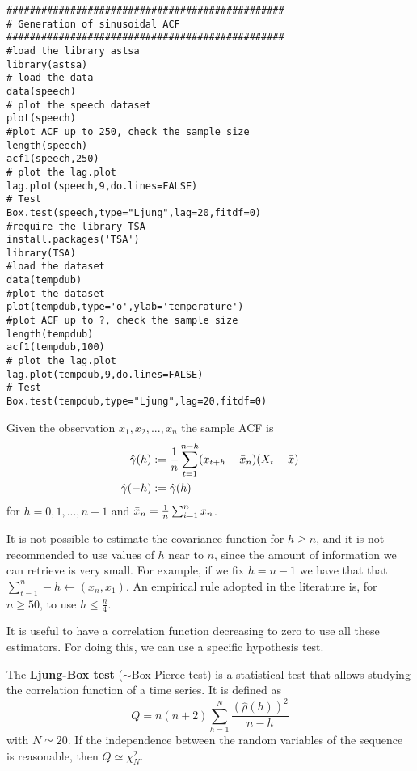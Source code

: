\begin{example}
    \begin{verbatim}
################################################
# Generation of sinusoidal ACF
################################################
#load the library astsa
library(astsa)
# load the data
data(speech)
# plot the speech dataset
plot(speech)
#plot ACF up to 250, check the sample size
length(speech)
acf1(speech,250)
# plot the lag.plot
lag.plot(speech,9,do.lines=FALSE)
# Test
Box.test(speech,type="Ljung",lag=20,fitdf=0)
#require the library TSA
install.packages('TSA')
library(TSA)
#load the dataset
data(tempdub)
#plot the dataset
plot(tempdub,type='o',ylab='temperature')
#plot ACF up to ?, check the sample size
length(tempdub)
acf1(tempdub,100)
# plot the lag.plot
lag.plot(tempdub,9,do.lines=FALSE)
# Test
Box.test(tempdub,type="Ljung",lag=20,fitdf=0)
    \end{verbatim}
\end{example}

\begin{definition}
    Given the observation $x_1,x_2,...,x_n$ the sample ACF is
    \begin{equation*}
        \begin{split}
            \hat{\gamma}(h)&:=\frac{1}{n}\sum_{t=1}^{n-h}(x_{t+h}-\bar{x}_n)(X_t-\bar{x})\\
            \hat{\gamma}(-h)&:=\hat{\gamma}(h)\\
        \end{split}
    \end{equation*}
    for $h=0,1,...,n-1$ and $\bar{x}_n=\frac{1}{n}\sum_{i=1}^nx_n$.
\end{definition}

It is not possible to estimate the covariance function for $h\ge n$, and it is not recommended to use values of $h$ near to $n$, since the amount of information we can retrieve is very small. For example, if we fix $h=n-1$ we have that that $\sum_{t=1}^n-h\leftarrow(x_n,x_1)$. An empirical rule adopted in the literature is, for $n\ge50$, to use $h\le\frac{n}{4}$.

It is useful to have a correlation function decreasing to zero to use all these estimators. For doing this, we can use a specific hypothesis test.

\begin{definition}
    The \textbf{Ljung-Box test} ($\sim$Box-Pierce test) is a statistical test that allows studying the correlation function of a time series. It is defined as
    \[
        Q=n(n+2)\sum_{h=1}^N\frac{(\hat{\rho}(h))^2}{n-h} 
    \]
    with $N\simeq20$. If the independence between the random variables of the sequence is reasonable, then $Q\simeq\chi^2_N$.
\end{definition}

